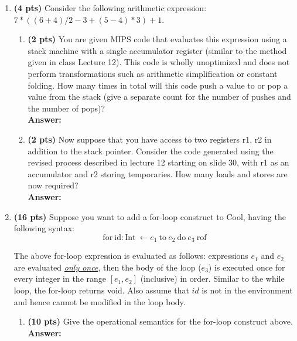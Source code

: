 \documentclass[11pt]{article}
\begin{document}
\begin{enumerate}
\begin{enumerate}
   \newpage
    
  \end{enumerate}
  
  \item \textbf{(4 pts)} Consider the following arithmetic expression: $7*((6+4)/2 - 3 + (5-4)*3) + 1$.
  
  \begin{enumerate}
    \item \textbf{(2 pts)} You are given MIPS code that evaluates this expression using a stack machine with a single accumulator register (similar to the method given in class Lecture 12). This code is wholly unoptimized and does not perform transformations such as arithmetic simplification or constant folding. How many times in total will this code push a value to or pop a value from the stack (give a separate count for the number of pushes and the number of pops)?\\
    \textbf{Answer:} 
    
   \newpage
    \item \textbf{(2 pts)} Now suppose that you have access to two registers r1, r2 in addition to the stack pointer. Consider the code generated using the revised process described in lecture 12 starting on slide 30, with r1 as an accumulator and r2 storing temporaries. How many loads and stores are now required?\\
    \textbf{Answer:} 
    
   \newpage
  \end{enumerate}
    
  \item \textbf{(16 pts)} Suppose you want to add a for-loop construct to Cool, having the following syntax:\\
  
  $$\mbox{for}\ \mbox{id}: \mbox{Int}\ \leftarrow e_1\ \mbox{to}\ e_2\ \mbox{do}\ e_3\ \mbox{rof}$$ 
  
  The above for-loop expression is evaluated as follows: expressions $e_1$ and $e_2$ are evaluated \underline{\emph{only once}}, then the body of the loop ($e_3$) is executed once for every integer in the range $[e_1, e_2]$ (inclusive) in order. Similar to the while loop, the for-loop returns void. Also assume that $id$ is not in the environment and hence cannot be modified in the loop body.
  
   \begin{enumerate}
    \item \textbf{(10 pts)} Give the operational semantics for the for-loop construct above.\\
    \textbf{Answer:} 
    

\end{enumerate}
\end{enumerate}
\end{document}
